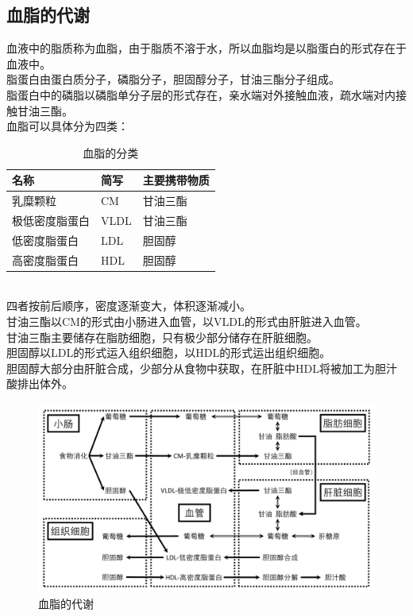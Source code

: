 \documentclass[UTF8]{ctexart}
\begin{document}
\subsection{血脂的代谢}
    血液中的脂质称为血脂，由于脂质不溶于水，所以血脂均是以脂蛋白的形式存在于血液中。\\[3mm]
    脂蛋白由蛋白质分子，磷脂分子，胆固醇分子，甘油三酯分子组成。\\[3mm]
    脂蛋白中的磷脂以磷脂单分子层的形式存在，亲水端对外接触血液，疏水端对内接触甘油三酯。\\[3mm]
    血脂可以具体分为四类：\vspace{5pt}
    \begin{table}[h]
        \begin{center}
            \begin{tabular}{l|l|l}
                \hline
                名称\qquad\qquad\qquad&简写\qquad\qquad\qquad&主要携带物质\qquad\qquad\qquad\\ \hline
                乳糜颗粒&CM&甘油三酯\\ \hline
                极低密度脂蛋白&VLDL&甘油三酯\\ \hline
                低密度脂蛋白&LDL&胆固醇\\ \hline
                高密度脂蛋白&HDL&胆固醇\\ \hline
            \end{tabular}
        \end{center}
        \caption{血脂的分类}
    \end{table}\\
    四者按前后顺序，密度逐渐变大，体积逐渐减小。\\[3mm]
    甘油三酯以CM的形式由小肠进入血管，以VLDL的形式由肝脏进入血管。\\[3mm]
    甘油三酯主要储存在脂肪细胞，只有极少部分储存在肝脏细胞。\\[3mm]
    胆固醇以LDL的形式运入组织细胞，以HDL的形式运出组织细胞。\\[3mm]
    胆固醇大部分由肝脏合成，少部分从食物中获取，在肝脏中HDL将被加工为胆汁酸排出体外。\vspace{5pt}
    \begin{figure}[h]
        \begin{center}
            \includegraphics[width=14cm]{BiologyImage/56.jpg}
        \end{center}
        \caption{血脂的代谢}
    \end{figure}
\end{document}
